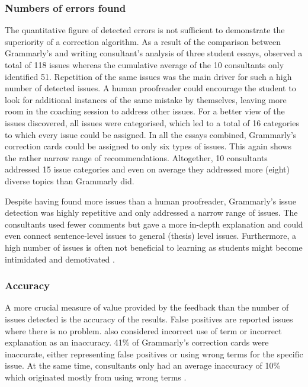 \documentclass[runningheads]{llncs}
\let\OldTextregistered\textregistered
\renewcommand{\textregistered}{\OldTextregistered\xspace}
\begin{document}
\subsubsection{Numbers of errors found}
The quantitative figure of detected errors is not sufficient to demonstrate the superiority of a correction algorithm. As a result of the comparison between Grammarly\textregistered's and writing consultant's analysis of three student essays, \textcite{dembsey_closing_2017} observed a total of 118 issues whereas the cumulative average of the 10 consultants only identified 51. Repetition of the same issues was the main driver for such a high number of detected issues. A human proofreader could encourage the student to look for additional instances of the same mistake by themselves, leaving more room in the coaching session to address other issues. For a better view of the issues discovered, all issues were categorised, which led to a total of 16 categories to which every issue could be assigned. In all the essays combined, Grammarly\textregistered's correction cards could be assigned to only six types of issues. This again shows the rather narrow range of recommendations. Altogether, 10 consultants addressed 15 issue categories and even on average they addressed more (eight) diverse topics than Grammarly\textregistered did.

Despite having found more issues than a human proofreader, Grammarly\textregistered's issue detection was highly repetitive and only addressed a narrow range of issues. The consultants used fewer comments but gave a more in-depth explanation and could even connect sentence-level issues to general (thesis) level issues. Furthermore, a high number of issues is often not beneficial to learning as students might become intimidated and demotivated \citep{dembsey_closing_2017}.


\subsubsection{Accuracy}
A more crucial measure of value provided by the feedback than the number of issues detected is the accuracy of the results. False positives are reported issues where there is no problem. \textcite{dembsey_closing_2017} also considered incorrect use of term or incorrect explanation as an inaccuracy. 41\% of Grammarly\textregistered's correction cards were inaccurate, either representing false positives or using wrong terms for the specific issue. At the same time, consultants only had an average inaccuracy of 10\% which originated mostly from using wrong terms \citep{dembsey_closing_2017}.
\end{document}
